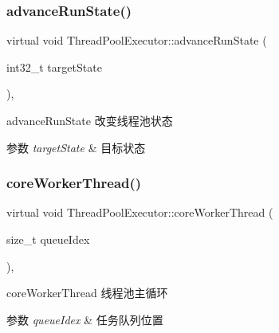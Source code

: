 \subsubsection{\texorpdfstring{advance\+Run\+State()}{advanceRunState()}}
{\footnotesize\ttfamily virtual void Thread\+Pool\+Executor\+::advance\+Run\+State (\begin{DoxyParamCaption}\item[{int32\+\_\+t}]{target\+State }\end{DoxyParamCaption})\hspace{0.3cm}{\ttfamily [protected]}, {\ttfamily [virtual]}}



advance\+Run\+State 改变线程池状态 


\begin{DoxyParams}{参数}
{\em target\+State} & 目标状态 \\
\hline
\end{DoxyParams}
\mbox{\label{classThreadPoolExecutor_a5e40839bf4191b5eab9d81227ddb62c3}} 
\subsubsection{\texorpdfstring{core\+Worker\+Thread()}{coreWorkerThread()}}
{\footnotesize\ttfamily virtual void Thread\+Pool\+Executor\+::core\+Worker\+Thread (\begin{DoxyParamCaption}\item[{size\+\_\+t}]{queue\+Idex }\end{DoxyParamCaption})\hspace{0.3cm}{\ttfamily [protected]}, {\ttfamily [virtual]}}



core\+Worker\+Thread 线程池主循环 


\begin{DoxyParams}{参数}
{\em queue\+Idex} & 任务队列位置 \\
\hline
\end{DoxyParams}
\mbox{\label{classThreadPoolExecutor_a73773038a4cce87d62e1c7715670aee7}} 
